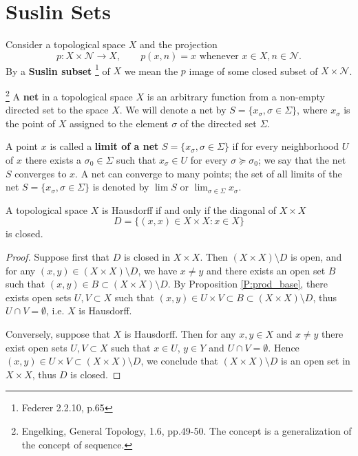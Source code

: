 \section{Suslin Sets}

\begin{definition} \label{D:suslin_set}
Consider a topological space $X$ and the projection
\[
	p: X\times \mathcal{N} \to X, \qquad 
	\text{$p(x,n) = x$ whenever $x\in X, n\in\mathcal{N}$}.
\]
By a \textbf{Suslin subset}
\footnote{Federer 2.2.10, p.65}
of $X$ we mean the $p$ image of some closed subset of $X\times \mathcal{N}$.
\end{definition}

\begin{definition}
\footnote{Engelking, General Topology, 1.6, pp.49-50. The concept is a
  generalization of the concept of sequence.}
A \textbf{net} 
in a topological space $X$ is an arbitrary function from a non-empty directed
set to the space $X$. We will denote a net by 
$S=\{x_{\sigma}, \sigma\in\Sigma\}$, where $x_{\sigma}$ is the point of $X$
assigned to the element $\sigma$ of the directed set $\Sigma$.

A point $x$ is called a \textbf{limit of a net}
$S=\{x_{\sigma}, \sigma\in\Sigma\}$ if for every neighborhood $U$ of $x$ there
exists a $\sigma_0\in\Sigma$ such that $x_{\sigma}\in U$ for every 
$\sigma\succeq\sigma_0$; we say that the net $S$ converges to $x$. A net can
converge to many points; the set of all limits of the net
$S=\{x_{\sigma}, \sigma\in\Sigma\}$ is denoted by $\lim S$ or
$\lim_{\sigma\in\Sigma} x_{\sigma}$. 
\end{definition}

\begin{proposition} \label{P:haus_diag}
A topological space $X$ is Hausdorff if and only if the diagonal of $X\times X$
\[
	D= \{ (x,x)\in X\times X: x\in X \}
\]
is closed.
\end{proposition}
\begin{proof}
Suppose first that $D$ is closed in $X\times X$. Then $(X\times X)\setminus D$
is open, and for any $(x,y)\in (X\times X)\setminus D$, we have $x\neq y$ and
there exists an open set $B$ such that 
$(x,y)\in B \subset (X\times X)\setminus D$. By Proposition
\ref{P:prod_base}, there exists open sets $U,V\subset X$ such that
$(x,y)\in U\times V \subset B \subset (X\times X)\setminus D$, thus 
$U\cap V=\emptyset$, i.e. $X$ is Hausdorff.

Conversely, suppose that $X$ is Hausdorff. Then for any $x,y\in X$ and $x\neq y$
there exist open sets $U,V\subset X$ such that $x\in U$, $y\in Y$ and 
$U\cap V=\emptyset$. Hence $(x,y)\in U\times V \subset (X\times X)\setminus D$,
we conclude that $(X\times X)\setminus D$ is an open set in $X\times X$, thus
$D$ is closed.
\end{proof}

